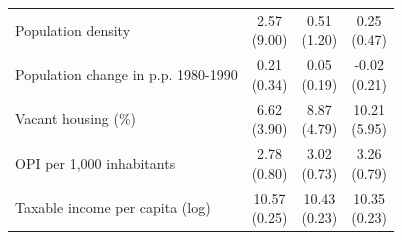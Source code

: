 \begin{table}[!h]
{\begin{tabular}[t]{>{\raggedright\arraybackslash}p{7cm}ccc}
\hspace{1em}Population density & \makecell{2.57 \\ (9.00)} & \makecell{0.51 \\ (1.20)} & \makecell{0.25 \\ (0.47)}\\
\hspace{1em}Population change in p.p. 1980-1990 & \makecell{0.21 \\ (0.34)} & \makecell{0.05 \\ (0.19)} & \makecell{-0.02 \\ (0.21)}\\
\hspace{1em}Vacant housing (\%) & \makecell{6.62 \\ (3.90)} & \makecell{8.87 \\ (4.79)} & \makecell{10.21 \\ (5.95)}\\
\hspace{1em}OPI per 1,000 inhabitants & \makecell{2.78 \\ (0.80)} & \makecell{3.02 \\ (0.73)} & \makecell{3.26 \\ (0.79)}\\
\hspace{1em}Taxable income per capita  (log) & \makecell{10.57 \\ (0.25)} & \makecell{10.43 \\ (0.23)} & \makecell{10.35 \\ (0.23)}\\
\bottomrule
\end{tabular}}
\end{table}
\clearpage
